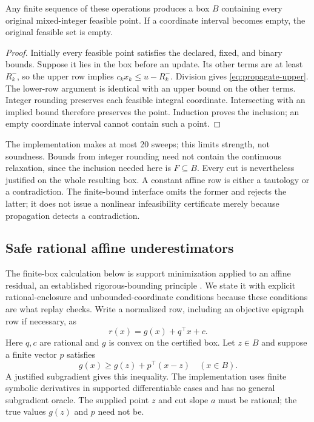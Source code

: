 \begin{lemma}
\label{lem:propagation}
Any finite sequence of these operations produces a box $B$ containing every original mixed-integer feasible point. If a coordinate interval becomes empty, the original feasible set is empty.
\end{lemma}
\begin{proof}
Initially every feasible point satisfies the declared, fixed, and binary bounds. Suppose it lies in the box before an update. Its other terms are at least $R_k^-$, so the upper row implies $c_kx_k\leq u-R_k^-$. Division gives \eqref{eq:propagate-upper}. The lower-row argument is identical with an upper bound on the other terms. Integer rounding preserves each feasible integral coordinate. Intersecting with an implied bound therefore preserves the point. Induction proves the inclusion; an empty coordinate interval cannot contain such a point.
\end{proof}
The implementation makes at most 20 sweeps; this limits strength, not soundness. Bounds from integer rounding need not contain the continuous relaxation, since the inclusion needed here is $F\subseteq B$. Every cut is nevertheless justified on the whole resulting box. A constant affine row is either a tautology or a contradiction. The finite-bound interface omits the former and rejects the latter; it does not issue a nonlinear infeasibility certificate merely because propagation detects a contradiction.

\subsection{Safe rational affine underestimators}
\label{sec:safe-cuts}
The finite-box calculation below is support minimization applied to an affine residual, an established rigorous-bounding principle \citep{jansson2004-rigorous-convex,messine2019-reliable-relaxation}. We state it with explicit rational-enclosure and unbounded-coordinate conditions because these conditions are what replay checks.
Write a normalized row, including an objective epigraph row if necessary, as
\begin{equation}
 r(x)=g(x)+q^\top x+c.
 \label{eq:row-decomposition}
\end{equation}
Here $q,c$ are rational and $g$ is convex on the certified box. Let $z\in B$ and suppose a finite vector $p$ satisfies
\begin{equation}
 g(x)\geq g(z)+p^\top(x-z)\quad(x\in B).
 \label{eq:g-support}
\end{equation}
A justified subgradient gives this inequality. The implementation uses finite symbolic derivatives in supported differentiable cases and has no general subgradient oracle. The supplied point $z$ and cut slope $a$ must be rational; the true values $g(z)$ and $p$ need not be.

